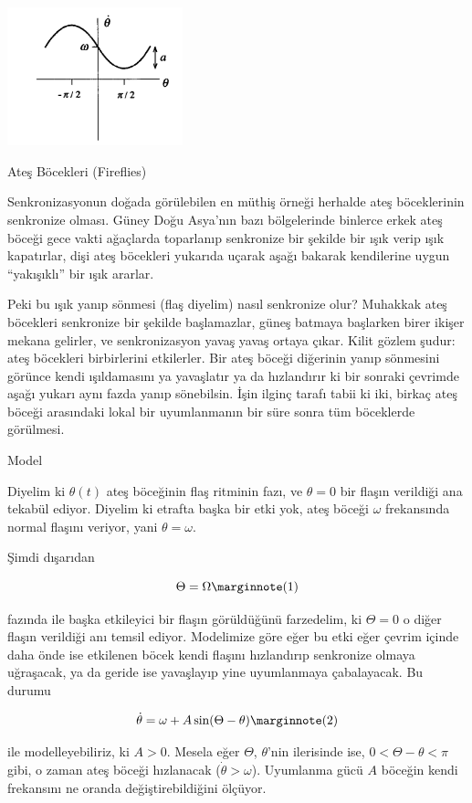 \documentclass[12pt,fleqn]{article}\usepackage{../../common}
\begin{document}
\includegraphics[height=4cm]{04_17.png}

Ateş Böcekleri (Fireflies)

Senkronizasyonun doğada görülebilen en müthiş örneği herhalde ateş böceklerinin
senkronize olması. Güney Doğu Asya'nın bazı bölgelerinde binlerce erkek ateş
böceği gece vakti ağaçlarda toparlanıp senkronize bir şekilde bir ışık verip
ışık kapatırlar, dişi ateş böcekleri yukarıda uçarak aşağı bakarak kendilerine
uygun ``yakışıklı'' bir ışık ararlar.

Peki bu ışık yanıp sönmesi (flaş diyelim) nasıl senkronize olur? Muhakkak ateş
böcekleri senkronize bir şekilde başlamazlar, güneş batmaya başlarken birer
ikişer mekana gelirler, ve senkronizasyon yavaş yavaş ortaya çıkar. Kilit gözlem
şudur: ateş böcekleri birbirlerini etkilerler. Bir ateş böceği diğerinin yanıp
sönmesini görünce kendi ışıldamasını ya yavaşlatır ya da hızlandırır ki bir
sonraki çevrimde aşağı yukarı aynı fazda yanıp sönebilsin. İşin ilginç tarafı
tabii ki iki, birkaç ateş böceği arasındaki lokal bir uyumlanmanın bir süre
sonra tüm böceklerde görülmesi.

Model

Diyelim ki $\theta(t)$ ateş böceğinin flaş ritminin fazı, ve $\theta=0$ bir
flaşın verildiği ana tekabül ediyor. Diyelim ki etrafta başka bir etki yok, ateş
böceği $\omega$ frekansında normal flaşını veriyor, yani $\theta = \omega$.

Şimdi dışarıdan

$$\Theta = \Omega 
\mlabel{1}$$

fazında ile başka etkileyici bir flaşın görüldüğünü farzedelim, ki $\Theta=0$ o
diğer flaşın verildiği anı temsil ediyor. Modelimize göre eğer bu etki eğer
çevrim içinde daha önde ise etkilenen böcek kendi flaşını hızlandırıp senkronize
olmaya uğraşacak, ya da geride ise yavaşlayıp yine uyumlanmaya çabalayacak. Bu
durumu

$$ \dot{\theta} = \omega + A \sin(\Theta - \theta) 
\mlabel{2} $$

ile modelleyebiliriz, ki $A > 0$. Mesela eğer $\Theta$, $\theta$'nin ilerisinde
ise, $0 < \Theta - \theta < \pi$ gibi, o zaman ateş böceği hızlanacak
($\dot{\theta} > \omega$). Uyumlanma gücü $A$ böceğin kendi frekansını ne oranda
değiştirebildiğini ölçüyor.
\end{document}
